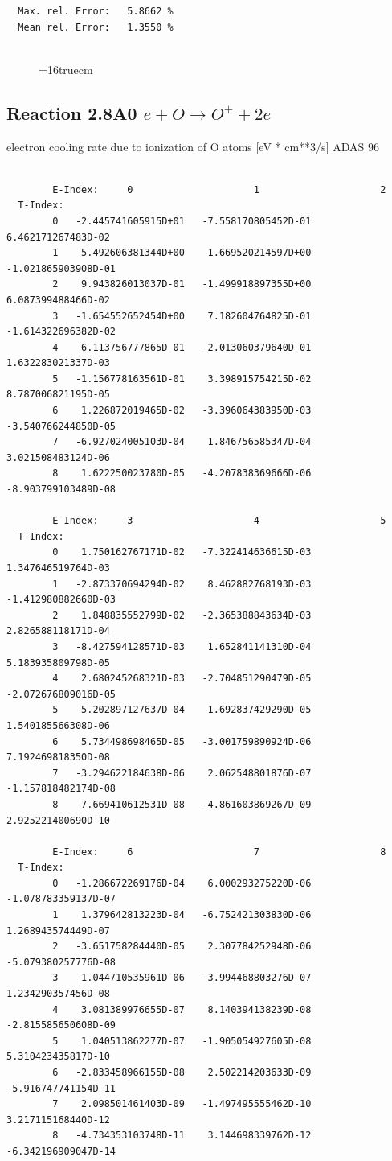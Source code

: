 \documentclass[12pt,dvips]{article}
\begin{document}
\begin{small}
\begin{verbatim}
  Max. rel. Error:   5.8662 %
  Mean rel. Error:   1.3550 %


\end{verbatim}\end{small}
\begin{figure} \label{2.7il}
\epsfxsize=16truecm 
\end{figure}
\newpage

\subsection{
  Reaction 2.8A0  $e + O  \rightarrow O^+   + 2e $
}
electron cooling rate due to ionization of O atoms [eV * cm**3/s]
ADAS 96

\begin{small}\begin{verbatim}

        E-Index:     0                     1                     2
  T-Index:
        0   -2.445741605915D+01   -7.558170805452D-01    6.462171267483D-02
        1    5.492606381344D+00    1.669520214597D+00   -1.021865903908D-01
        2    9.943826013037D-01   -1.499918897355D+00    6.087399488466D-02
        3   -1.654552652454D+00    7.182604764825D-01   -1.614322696382D-02
        4    6.113756777865D-01   -2.013060379640D-01    1.632283021337D-03
        5   -1.156778163561D-01    3.398915754215D-02    8.787006821195D-05
        6    1.226872019465D-02   -3.396064383950D-03   -3.540766244850D-05
        7   -6.927024005103D-04    1.846756585347D-04    3.021508483124D-06
        8    1.622250023780D-05   -4.207838369666D-06   -8.903799103489D-08

        E-Index:     3                     4                     5
  T-Index:
        0    1.750162767171D-02   -7.322414636615D-03    1.347646519764D-03
        1   -2.873370694294D-02    8.462882768193D-03   -1.412980882660D-03
        2    1.848835552799D-02   -2.365388843634D-03    2.826588118171D-04
        3   -8.427594128571D-03    1.652841141310D-04    5.183935809798D-05
        4    2.680245268321D-03   -2.704851290479D-05   -2.072676809016D-05
        5   -5.202897127637D-04    1.692837429290D-05    1.540185566308D-06
        6    5.734498698465D-05   -3.001759890924D-06    7.192469818350D-08
        7   -3.294622184638D-06    2.062548801876D-07   -1.157818482174D-08
        8    7.669410612531D-08   -4.861603869267D-09    2.925221400690D-10

        E-Index:     6                     7                     8
  T-Index:
        0   -1.286672269176D-04    6.000293275220D-06   -1.078783359137D-07
        1    1.379642813223D-04   -6.752421303830D-06    1.268943574449D-07
        2   -3.651758284440D-05    2.307784252948D-06   -5.079380257776D-08
        3    1.044710535961D-06   -3.994468803276D-07    1.234290357456D-08
        4    3.081389976655D-07    8.140394138239D-08   -2.815585650608D-09
        5    1.040513862277D-07   -1.905054927605D-08    5.310423435817D-10
        6   -2.833458966155D-08    2.502214203633D-09   -5.916747741154D-11
        7    2.098501461403D-09   -1.497495555462D-10    3.217115168440D-12
        8   -4.734353103748D-11    3.144698339762D-12   -6.342196909047D-14


\end{verbatim}
\end{small}
\end{document}
